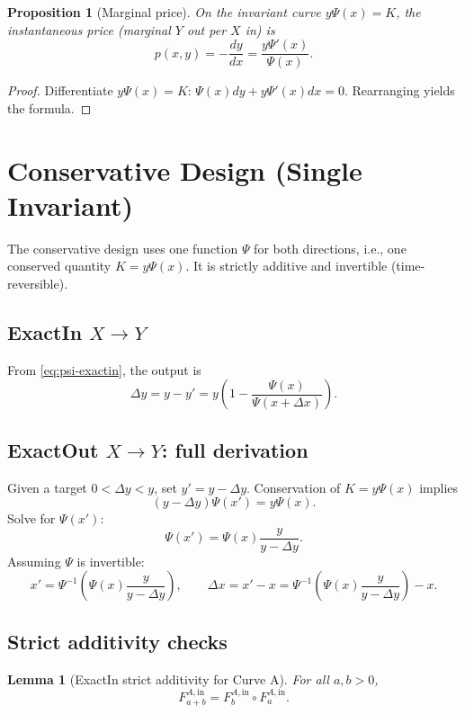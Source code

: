 \documentclass[11pt]{article}
\newtheorem{lemma}[theorem]{Lemma}
\newtheorem{proposition}[theorem]{Proposition}
\theoremstyle{definition}
\theoremstyle{remark}
\newcommand{\dx}{\Delta x}
\newcommand{\dy}{\Delta y}
\begin{document}
\begin{proposition}[Marginal price]
On the invariant curve $y\Psi(x)=K$, the instantaneous price (marginal $Y$ out per $X$ in) is
\[
\boxed{p(x,y)=-\frac{dy}{dx} = \frac{y\Psi'(x)}{\Psi(x)}.}
\]
\end{proposition}

\begin{proof}
Differentiate $y\Psi(x)=K$:
$\Psi(x)dy + y\Psi'(x)dx =0$. Rearranging yields the formula.
\end{proof}

\section{Conservative Design (Single Invariant)}\label{sec:conservative}

The conservative design uses one function $\Psi$ for both directions, i.e., one conserved quantity $K=y\Psi(x)$. It is strictly additive and invertible (time-reversible).

\subsection{ExactIn $X\to Y$}

From \eqref{eq:psi-exactin}, the output is
\begin{equation}
\boxed{\;\Delta y = y-y' = y\left(1-\frac{\Psi(x)}{\Psi(x+\dx)}\right).\;}
\label{eq:curveA-exactin-out}
\end{equation}

\subsection{ExactOut $X\to Y$: full derivation}

Given a target $0<\dy<y$, set $y'=y-\dy$.
Conservation of $K=y\Psi(x)$ implies
\[
 (y-\dy)\Psi(x') = y\Psi(x).
\]
Solve for $\Psi(x')$:
\[
 \Psi(x') = \Psi(x)\frac{y}{y-\dy}.
\]
Assuming $\Psi$ is invertible:
\[
 x' = \Psi^{-1}\!\left(\Psi(x)\frac{y}{y-\dy}\right),\qquad
 \boxed{\dx = x'-x = \Psi^{-1}\!\left(\Psi(x)\frac{y}{y-\dy}\right)-x.}
\]

\subsection{Strict additivity checks}

\begin{lemma}[ExactIn strict additivity for Curve A]
For all $a,b>0$,
\[
F^{A,\mathrm{in}}_{a+b} = F^{A,\mathrm{in}}_b\circ F^{A,\mathrm{in}}_a.
\]
\end{lemma}
\end{document}

